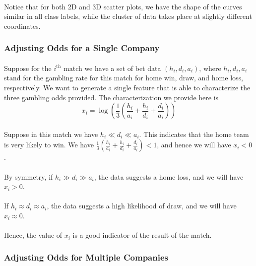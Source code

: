 \documentclass[12pt]{article}
\begin{document}
\paragraph{}
Notice that for both 2D and 3D scatter plots, we have the shape of the curves similar in all class labels, while the cluster of data takes place at slightly different coordinates.

\subsubsection{Adjusting Odds for a Single Company}
\paragraph{}
Suppose for the $i^{\text{th}}$ match we have a set of bet data $(h_i, d_i, a_i)$, where $h_i, d_i, a_i$ stand for the gambling rate for this match for home win, draw, and home loss, respectively. We want to generate a single feature that is able to characterize the three gambling odds provided. The characterization we provide here is \[
x_i = \log(\frac{1}{3}(\frac{h_i}{a_i} + \frac{h_i}{d_i} + \frac{d_i}{a_i}))
\]
\paragraph{}
Suppose in this match we have $h_i \ll d_i \ll a_i$. This indicates that the home team is very likely to win. We have $\frac{1}{3}(\frac{h_i}{a_i} + \frac{h_i}{d_i} + \frac{d_i}{a_i}) < 1$, and hence we will have $x_i < 0$. 
\paragraph{}
By symmetry, if $h_i \gg d_i \gg a_i$, the data suggests a home loss, and we will have $x_i > 0$.
\paragraph{}
If $h_i \approx d_i \approx a_i$, the data suggests a high likelihood of draw, and we will have $x_i \approx 0$.
\paragraph{}
Hence, the value of $x_i$ is a good indicator of the result of the match.
\subsubsection{Adjusting Odds for Multiple Companies}
\end{document}
